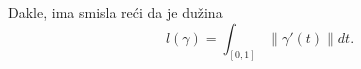 \documentclass[preview]{standalone}
\begin{document}
\begin{center}
Dakle, ima smisla reći da je dužina \[l(\gamma) = 
        \int_{[0,1]} \lVert \gamma'(t)\rVert dt.\]
\end{center}
\end{document}
